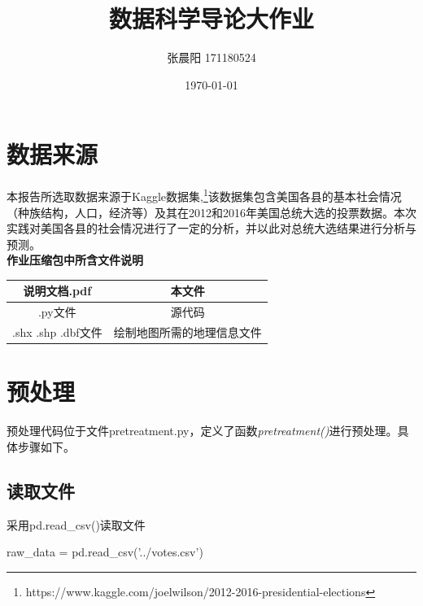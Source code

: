 \documentclass[
12pt, %
UTF8
]{fphw}
\title{数据科学导论大作业} %
\author{张晨阳 171180524} %
\date{\today} %
\institute{电子科学与工程学院} %
\begin{document}
\maketitle %

\section{数据来源}
本报告所选取数据来源于Kaggle数据集,\footnote{https://www.kaggle.com/joelwilson/2012-2016-presidential-elections}该数据集包含美国各县的基本社会情况（种族结构，人口，经济等）及其在2012和2016年美国总统大选的投票数据。本次实践对美国各县的社会情况进行了一定的分析，并以此对总统大选结果进行分析与预测。\\
\textbf{作业压缩包中所含文件说明}
\begin{center}
	\begin{tabular}{|c|c|}
	\hline
	说明文档.pdf&本文件\\
	\hline
	.py文件 &源代码\\
	\hline
	.shx .shp .dbf文件&绘制地图所需的地理信息文件\\
	\hline
\end{tabular}
\end{center}

\section{预处理}
预处理代码位于文件pretreatment.py，定义了函数\emph{pretreatment()}进行预处理。具体步骤如下。
	\subsection{读取文件}
	采用pd.read\_csv()读取文件\\
	\begin{python}
		raw_data = pd.read_csv('../votes.csv')
	\end{python}
\end{document}
